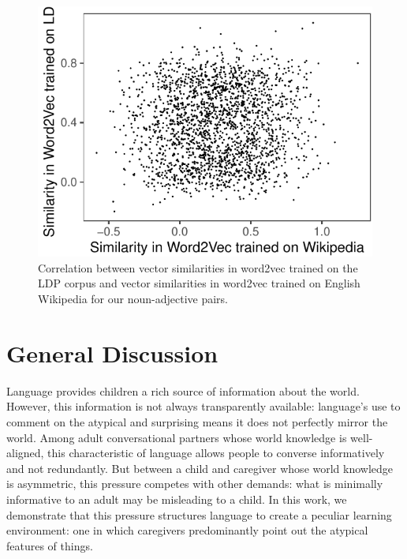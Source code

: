 \documentclass[10pt, letterpaper]{article}
\newenvironment{CodeChunk}{}{}
\begin{document}
\begin{CodeChunk}
\begin{figure}[tb]

{\centering \includegraphics{figs/word2vec2-1} 

}

\caption[Correlation between vector similarities in word2vec trained on the LDP corpus and vector similarities in word2vec trained on English Wikipedia for our noun-adjective pairs]{Correlation between vector similarities in word2vec trained on the LDP corpus and vector similarities in word2vec trained on English Wikipedia for our noun-adjective pairs.}\label{fig:word2vec2}
\end{figure}
\end{CodeChunk}

\hypertarget{general-discussion}{%
\section{General Discussion}\label{general-discussion}}

Language provides children a rich source of information about the world.
However, this information is not always transparently available:
language's use to comment on the atypical and surprising means it does
not perfectly mirror the world. Among adult conversational partners
whose world knowledge is well-aligned, this characteristic of language
allows people to converse informatively and not redundantly. But between
a child and caregiver whose world knowledge is asymmetric, this pressure
competes with other demands: what is minimally informative to an adult
may be misleading to a child. In this work, we demonstrate that this
pressure structures language to create a peculiar learning environment:
one in which caregivers predominantly point out the atypical features of
things.
\end{document}
